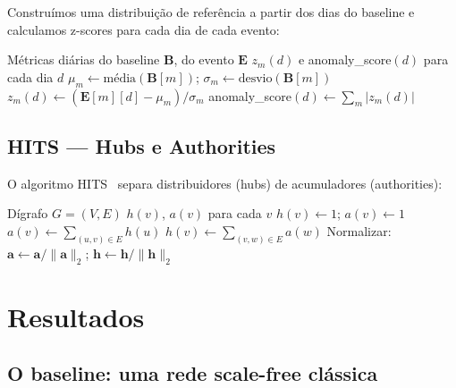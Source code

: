 \documentclass[12pt,a4paper]{article}
\begin{document}
Construímos uma distribuição de referência a partir dos dias do baseline e calculamos z-scores para cada dia de cada evento:

\begin{algorithm}[H]
\caption{Detecção de Anomalia via Z-score}
\begin{algorithmic}[1]
\Require Métricas diárias do baseline $\mathbf{B}$, do evento $\mathbf{E}$
\Ensure $z_m(d)$ e anomaly\_score$(d)$ para cada dia $d$
  \State $\mu_m \gets \text{média}(\mathbf{B}[m])$; \quad $\sigma_m \gets \text{desvio}(\mathbf{B}[m])$
\EndFor
{}
    \State $z_m(d) \gets (\mathbf{E}[m][d] - \mu_m) / \sigma_m$
  \EndFor
  \State anomaly\_score$(d) \gets \sum_m |z_m(d)|$
\EndFor
\end{algorithmic}
\end{algorithm}

\subsection{HITS --- Hubs e Authorities}

O algoritmo HITS~\cite{kleinberg1999} separa distribuidores (hubs) de acumuladores (authorities):

\begin{algorithm}[H]
\caption{HITS (Kleinberg)}
\begin{algorithmic}[1]
\Require Dígrafo $G = (V, E)$
\Ensure $h(v)$, $a(v)$ para cada $v$
 $h(v) \gets 1$; $a(v) \gets 1$ \EndFor
\Repeat
   $a(v) \gets \sum_{(u,v) \in E} h(u)$ \EndFor
   $h(v) \gets \sum_{(v,w) \in E} a(w)$ \EndFor
  \State Normalizar: $\mathbf{a} \gets \mathbf{a}/\|\mathbf{a}\|_2$; \quad $\mathbf{h} \gets \mathbf{h}/\|\mathbf{h}\|_2$
\end{algorithmic}
\end{algorithm}

\section{Resultados}

\subsection{O baseline: uma rede scale-free clássica}
\end{document}
